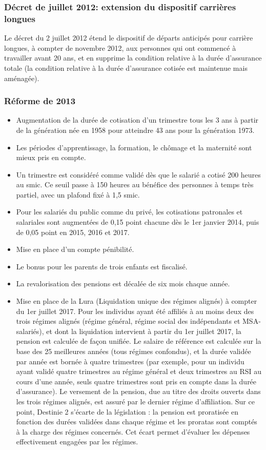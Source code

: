\subsubsection{Décret de juillet 2012: extension du dispositif carrières longues}

Le décret du 2 juillet 2012 étend le dispositif de départs anticipés pour carrière longues, à compter de novembre 2012, aux personnes qui ont commencé à travailler avant 20 ans, et en supprime la condition relative à la durée d'assurance totale (la condition relative à la durée d'assurance cotisée est maintenue mais aménagée).

\subsubsection{Réforme de 2013}
\begin{itemize}
   \item Augmentation de la durée de cotisation d'un trimestre tous les 3 ans à partir de la génération née en 1958 pour atteindre 43 ans pour la génération 1973.
   \item Les périodes d'apprentissage, la formation, le chômage et la maternité sont mieux pris en compte.
   \item Un trimestre est considéré comme validé dès que le salarié a cotisé 200 heures au smic. Ce seuil passe à 150 heures au bénéfice des personnes à temps très partiel, avec un plafond fixé à 1,5 smic.
   \item Pour les salariés du public comme du privé, les cotisations patronales et salariales sont augmentées de 0,15 point chacune dès le 1er janvier 2014, puis de 0,05 point en 2015, 2016 et 2017.
   \item Mise en place d'un compte pénibilité.
   \item Le bonus pour les parents de trois enfants est fiscalisé.
   \item La revalorisation des pensions est décalée de six mois chaque année.
   \item Mise en place de la Lura (Liquidation unique des régimes alignés) à compter du 1er juillet 2017. Pour les individus ayant été affiliés à au moins deux des trois régimes alignés (régime général, régime social des indépendants et MSA-salariés), et dont la liquidation intervient à partir du 1er juillet 2017, la pension est calculée de façon unifiée. Le salaire de référence est calculée sur la base des 25 meilleures années (tous régimes confondus), et la durée validée par année est bornée à quatre trimestres (par exemple, pour un individu ayant validé quatre trimestres au régime général et deux trimestres au RSI au cours d'une année, seuls quatre trimestres sont pris en compte dans la durée d'assurance). Le versement de la pension, due au titre des droits ouverts dans les trois régimes alignés, est assuré par le dernier régime d’affiliation. Sur ce point, Destinie 2 s'écarte de la législation : la pension est proratisée en fonction des durées validées dans chaque régime et les proratas sont comptés à la charge des régimes concernés. Cet écart permet d'évaluer les dépenses effectivement engagées par les régimes.
\end{itemize}

